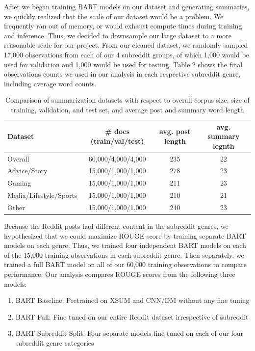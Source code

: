\documentclass[11pt,a4paper, twocolumn]{article}
\begin{document}
After we began training BART models on our dataset and generating summaries, we quickly realized that the scale of our dataset would be a problem. 
We frequently ran out of memory, or would exhaust compute times during training and inference. 
Thus, we decided to downsample our large dataset to a more reasonable scale for our project. 
From our cleaned dataset, we randomly sampled 17,000 observations from each of our 4 subreddit groups,
of which 1,000 would be used for validation and 1,000 would be used for testing. 
Table 2 shows the final observations counts we used in our analysis in each respective subreddit genre, including average word counts. 

\begin{table}
  \centering
  \begin{tabular}{lccc}
  \hline \textbf{Dataset} & \textbf{\# docs (train/val/test)} & \textbf{avg. post length} & \textbf{avg. summary legnth} \\ \hline
  Overall & 60,000/4,000/4,000  & 235 & 22 \\
  Advice/Story & 15,000/1,000/1,000 & 278 & 23 \\
  Gaming & 15,000/1,000/1,000 & 211 & 23 \\
  Media/Lifestyle/Sports & 15,000/1,000/1,000 & 210 & 21 \\
  Other & 15,000/1,000/1,000 & 240 & 23 \\
  \hline
  \end{tabular}
  \caption{\label{final_counts} Comparison of summarization datasets with respect to overall corpus size, size of training, validation, and
  test set, and average post and summary word length}
\end{table}

Because the Reddit posts had different content in the subreddit genres, 
we hypothesized that we could maximize ROUGE score by training separate BART models on each genre.
Thus, we trained four independent BART models on each of the 15,000 training observations in each subreddit genre. 
Then separately, we trained a full BART model on all of our 60,000 training observations to compare performance. 
Our analysis compares ROUGE scores from the following three models:

\begin{enumerate}
  \item BART Baseline: Pretrained on XSUM and CNN/DM without any fine tuning
  \item BART Full: Fine tuned on our entire Reddit dataset irrespective of subreddit
  \item BART Subreddit Split: Four separate models fine tuned on each of our four subreddit genre categories
\end{enumerate}
\end{document}
